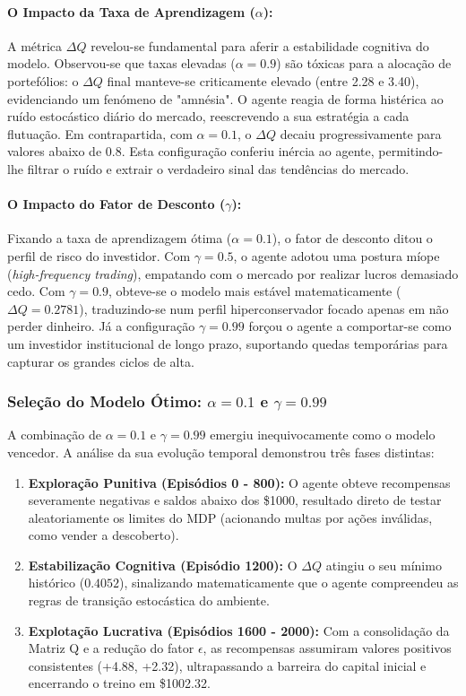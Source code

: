 \documentclass[12pt,a4paper]{article}
\begin{document}
\paragraph{O Impacto da Taxa de Aprendizagem ($\alpha$):} A métrica $\Delta Q$ revelou-se fundamental para aferir a estabilidade cognitiva do modelo.
Observou-se que taxas elevadas ($\alpha = 0.9$) são tóxicas para a alocação de portefólios: o $\Delta Q$ final manteve-se
criticamente elevado (entre 2.28 e 3.40), evidenciando um fenómeno de "amnésia".
O agente reagia de forma histérica ao ruído estocástico diário do mercado, reescrevendo a sua estratégia a cada flutuação.
Em contrapartida, com $\alpha = 0.1$, o $\Delta Q$ decaiu progressivamente para valores abaixo de 0.8. Esta configuração conferiu
inércia ao agente, permitindo-lhe filtrar o ruído e extrair o verdadeiro sinal das tendências do mercado.

\paragraph{O Impacto do Fator de Desconto ($\gamma$):} Fixando a taxa de aprendizagem ótima ($\alpha = 0.1$), o fator de desconto
ditou o perfil de risco do investidor. Com $\gamma = 0.5$, o agente adotou uma postura míope (\textit{high-frequency trading}),
empatando com o mercado por realizar lucros demasiado cedo. Com $\gamma = 0.9$, obteve-se o modelo mais estável matematicamente
($\Delta Q = 0.2781$), traduzindo-se num perfil hiperconservador focado apenas em não perder dinheiro. Já a configuração $\gamma = 0.99$
forçou o agente a comportar-se como um investidor institucional de longo prazo, suportando quedas temporárias para capturar os grandes
ciclos de alta.

\subsubsection{Seleção do Modelo Ótimo: $\alpha=0.1$ e $\gamma=0.99$}

A combinação de $\alpha=0.1$ e $\gamma=0.99$ emergiu inequivocamente como o modelo vencedor. A análise da sua evolução temporal
demonstrou três fases distintas:
\begin{enumerate}
	\item \textbf{Exploração Punitiva (Episódios 0 - 800):} O agente obteve recompensas severamente negativas e saldos abaixo dos \$1000,
	      resultado direto de testar aleatoriamente os limites do MDP (acionando multas por ações inválidas, como vender a descoberto).
	\item \textbf{Estabilização Cognitiva (Episódio 1200):} O $\Delta Q$ atingiu o seu mínimo histórico ($0.4052$), sinalizando matematicamente que o agente compreendeu as regras de transição estocástica do ambiente.
	\item \textbf{Explotação Lucrativa (Episódios 1600 - 2000):} Com a consolidação da Matriz Q e a redução do fator $\epsilon$, as recompensas
	      assumiram valores positivos consistentes (+4.88, +2.32), ultrapassando a barreira do capital inicial e encerrando o treino
	      em \$1002.32.
\end{enumerate}
\end{document}
